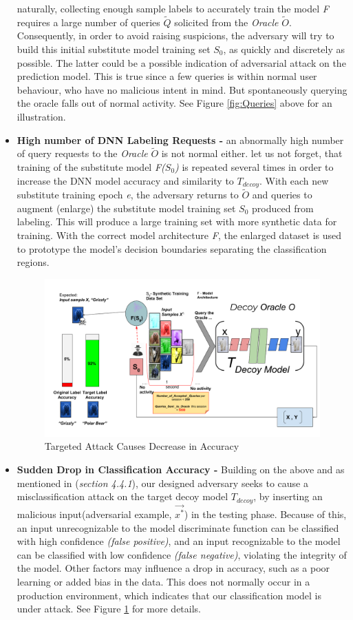 \documentclass[grad,lot,lof,11pt,oneside,onehalfspace]{RUthesis}
\begin{document}
\begin{itemize}
	naturally, collecting enough sample labels to accurately train the model \textit{F} requires a large number of queries \textit{$\tilde{Q}$} solicited from the \textit{Oracle} $\tilde{O}$. Consequently, in order to avoid raising suspicions, the adversary will try to build this initial substitute model training set \textit{$S_{0}$}, as quickly and discretely as possible. The latter could be a possible indication of adversarial attack on the prediction model. This is true since a few queries is within normal user behaviour, who have no malicious intent in mind. But spontaneously querying the oracle falls out of normal activity. See Figure	\ref*{fig:Queries} above for an illustration. 
	\item \textbf{High number of DNN Labeling Requests -} an abnormally high number of query requests to the \textit{Oracle} $\tilde{O}$ is not normal either. let us not forget, that training of the substitute model \textit{F($S_{0}$)} is repeated several times in order to increase the DNN model accuracy and similarity to \textit{$T_{decoy}$}. With each new substitute training epoch \textit{e}, the adversary returns to $\tilde{O}$ and queries to augment (enlarge) the substitute model training set $S_{0}$ produced from labeling. This will produce a large training set with more synthetic data for training. With the correct model architecture \textit{F}, the enlarged dataset is used to prototype the model’s decision boundaries separating the classification regions. 
   \begin{figure}[h]
	\centering
	\includegraphics[width=0.7\linewidth]{"Images/Chapter 4/misclassattack"}
	\caption{Targeted Attack Causes Decrease in Accuracy}
	\label{fig:misclassattack}
	\end{figure}
	\item \textbf{Sudden Drop in Classification Accuracy -}
	Building on the above and as mentioned in (\textit{section 4.4.1}), our designed adversary seeks to cause a misclassification attack on the target decoy model \textit{$T_{decoy}$}, by inserting an malicious input(adversarial example,  \textit{$\vec{x^{*}}$}) in the testing phase. Because of this, an input unrecognizable to the model discriminate function can be classified with high confidence \textit{(false positive)}, and an input recognizable to the model can be classified with low confidence \textit{(false negative)}, violating the integrity of the model. Other factors may influence a drop in accuracy, such as a poor learning or added bias in the data. This does not normally occur in a production environment, which indicates that our classification model is under attack. See Figure \ref{fig:misclassattack} for more details.  
	

\end{itemize}
\end{document}
